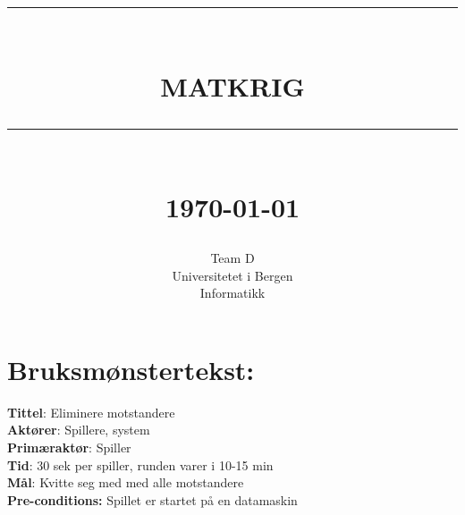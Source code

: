 \documentclass[12pt]{report}
\newcommand{\HRule}[1]{\rule{\linewidth}{#1}}
\begin{document}
\title{ \normalsize \textsc{}
		\\ [2.0cm]
		\HRule{0.5pt} \\
		\LARGE \textbf{\uppercase{Matkrig}}
		\HRule{2pt} \\ [0.5cm]
		\normalsize \today \vspace*{5\baselineskip}}

\date{}

\author{
		Team D  \\ 
		Universitetet i Bergen \\
		Informatikk }

\maketitle
\tableofcontents
\newpage

\sectionfont{\scshape}


\section*{Bruksm{\o}nstertekst:}

\textbf{Tittel}: Eliminere motstandere
\bigskip \\
\textbf{Akt{\o}rer}: Spillere, system
\bigskip \\
\textbf{Prim{\ae}rakt{\o}r}: Spiller
\bigskip \\
\textbf{Tid}: 30 sek per spiller, runden varer i 10-15 min
\bigskip \\
\textbf{M{\aa}l}: Kvitte seg med med alle motstandere
\bigskip \\
\textbf{Pre-conditions:} Spillet er startet p{\aa} en datamaskin
\end{document}
